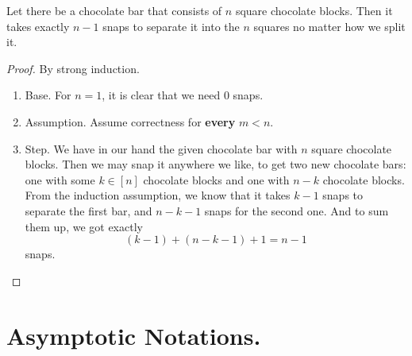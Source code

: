 
\begin{example} 
  \label{example:chockstrong}
  Let there be a chocolate bar that consists of \(n\) square chocolate blocks. Then it takes exactly \(n - 1\) snaps to separate it into the \(n\) squares no matter how we split it.

  \begin{proof} By strong induction. 
    \begin{enumerate}
      \item	Base. For \(n = 1\), it is clear that we need \(0\) snaps. 
      \item	Assumption. Assume correctness for \textbf{every} \(m < n \).
      \item	Step. We have in our hand the given chocolate bar with \(n\) square chocolate blocks. Then we may snap it anywhere we like, to get two new chocolate bars: one with some \( k \in [n]\) chocolate blocks and one with \(n - k\) chocolate blocks. From the induction assumption, we know that it takes \(k - 1\) snaps to separate the first bar, and \(n - k - 1\) snaps for the second one. And to sum them up, we got exactly \[ (k - 1) + (n - k - 1) + 1 = n - 1 \] snaps.
    \end{enumerate}
\end{proof}
\end{example}
\section{Asymptotic Notations.}


